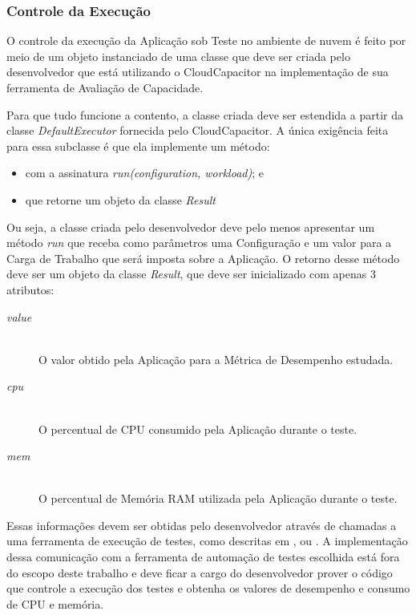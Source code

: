 \subsubsection{Controle da Execução}
\label{subsubsec:funcionamento_executor}
O controle da execução da Aplicação sob Teste no ambiente de nuvem é feito por 
meio de um objeto instanciado de uma classe que deve ser criada pelo
desenvolvedor que está utilizando o CloudCapacitor na implementação de sua 
ferramenta de Avaliação de Capacidade.

Para que tudo funcione a contento, a classe criada deve ser estendida a partir
da classe \emph{DefaultExecutor} fornecida pelo CloudCapacitor. A única 
exigência feita para essa subclasse é que ela implemente um método:

\begin{itemize}
  \item com a assinatura \emph{run(configuration, workload)}; e
  \item que retorne um objeto da classe \emph{Result}
\end{itemize}

Ou seja, a classe criada pelo desenvolvedor deve pelo menos apresentar um método
\emph{run} que receba como parâmetros uma Configuração e um valor para a Carga 
de Trabalho que será imposta sobre a Aplicação. O retorno desse método deve ser
um objeto da classe \emph{Result}, que deve ser inicializado com apenas 3 atributos:

\begin{description}
  \item[\emph{value}] \hfill \\
    O valor obtido pela Aplicação para a Métrica de Desempenho estudada.
  \item[\emph{cpu}] \hfill \\
    O percentual de CPU consumido pela Aplicação durante o teste.
  \item[\emph{mem}] \hfill \\
    O percentual de Memória RAM utilizada pela Aplicação durante o teste.
\end{description}

Essas informações devem ser obtidas pelo desenvolvedor através de chamadas a
uma ferramenta de execução de testes, como descritas em \cite{cunha2012ambiente}, 
\cite{jayasinghe2012} ou \cite{silva2013cloudbench}. A implementação dessa 
comunicação com a ferramenta de automação de testes escolhida está 
fora do escopo deste trabalho e deve ficar a cargo do desenvolvedor prover o 
código que controle a execução dos testes e obtenha os valores de desempenho
e consumo de CPU e memória.

